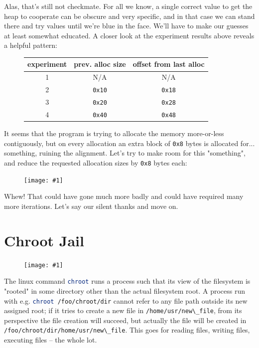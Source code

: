 \documentclass{article}
\newcommand{\displayimage}[1] {
\begin{figure}[H]
    \centering
    \texttt{[image: \#1]} 
\end{figure}
}
\newcommand{\wrapimageright}[1] {
    \begin{figure}
        \begin{center}
            \texttt{[image: \#1]} 
        \end{center}
    \end{figure}
}
\newcommand{\xcode}[2]{\colorbox{ubuntuback}{\lstinline[language=#1]|#2|}}
\newcommand{\code}[1]{\colorbox{ubuntuback}{\texttt{#1}}}
\begin{document}
Alas, that's still not checkmate. For all we know, a single correct value to get the heap to cooperate can be obscure and very specific, and in that case we can stand there and try values until we're blue in the face. We'll have to make our guesses at least somewhat educated. A closer look at the experiment results above reveals a helpful pattern:

\begin{figure}[H]
\centering
    \begin{tabular}{|c|c|c|} 
        \hline
        \textbf{experiment} & \textbf{prev. alloc size} & \textbf{offset from last alloc} \\
        \hline
        1 & N/A & N/A \\
        \hline
        2 & \code{0x10} & \code{0x18} \\
        \hline
        3 & \code{0x20} & \code{0x28} \\
        \hline
        4 & \code{0x40} & \code{0x48} \\
        \hline
\end{tabular}
\end{figure}

It seems that the program is trying to allocate the memory more-or-less contiguously, but on every allocation an extra block of \code{0x8} bytes is allocated for... something, ruining the alignment. Let's try to make room for this "something", and reduce the requested allocation sizes by \code{0x8} bytes each:

\displayimage{./exercises/16_memcpy/solution.png}

Whew! That could have gone much more badly and could have required many more iterations. Let's say our silent thanks and move on.

\section{Chroot Jail}

\wrapimageright{./images/chroot_jail.png}
The linux command \xcode{bash}{chroot} runs a process such that its view of the filesystem is "rooted" in some directory other than the actual filesystem root. A process run with e.g. \xcode{bash}{chroot /foo/chroot/dir} cannot refer to any file path outside its new assigned root; if it tries to create a new file in \xcode{bash}{/home/usr/new\_file}, from its perspective the file creation will succeed, but actually the file will be created in \xcode{bash}{/foo/chroot/dir/home/usr/new\_file}. This goes for reading files, writing files, executing files -- the whole lot. 
\end{document}
